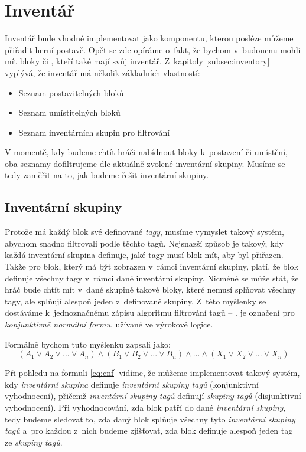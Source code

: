 
\section{Inventář}

Inventář bude vhodné implementovat jako komponentu, kterou posléze můžeme přiřadit herní postavě. Opět se zde opíráme o~fakt, že bychom v~budoucnu mohli mít bloky či \NPC{}, kteří také mají svůj inventář. Z~kapitoly \ref{subsec:inventory} vyplývá, že inventář má několik základních vlastností:

\begin{itemize}
	\item Seznam postavitelných bloků
	\item Seznam umístitelných bloků
	\item Seznam inventárních skupin pro filtrování
\end{itemize}

V momentě, kdy budeme chtít hráči nabídnout bloky k~postavení či umístění, oba seznamy dofiltrujeme dle aktuálně zvolené inventární skupiny. Musíme se tedy zaměřit na to, jak budeme řešit inventární skupiny.

\subsection{Inventární skupiny}

Protože má každý blok své definované \textit{tagy}, musíme vymyslet takový systém, abychom snadno filtrovali podle těchto tagů. Nejsnazší způsob je takový, kdy každá inventární skupina definuje, jaké tagy musí blok mít, aby byl přiřazen. Takže pro blok, který má být zobrazen v~rámci inventární skupiny, platí, že blok definuje všechny tagy v~rámci dané inventární skupiny. Nicméně se může stát, že hráč bude chtít mít v~dané skupině takové bloky, které nemusí splňovat všechny tagy, ale splňují alespoň jeden z~definované skupiny. Z~této myšlenky se dostáváme k~jednoznačnému zápisu algoritmu filtrování tagů -- \CNF{}. \CNF{} je označení pro \textit{konjunktivně normální formu}, užívané ve výrokové logice.

Formálně bychom tuto myšlenku zapsali jako:
\begin{equation}\label{eq:cnf}
	( A_1 \lor A_2 \lor ... \lor A_n )  \land ( B_1 \lor B_2 \lor ... \lor B_n ) \land ... \land ( X_1 \lor X_2 \lor ... \lor X_n )  
\end{equation}


Při pohledu na formuli \ref{eq:cnf} vidíme, že můžeme implementovat takový systém, kdy \textit{inventární skupina} definuje \textit{inventární skupiny tagů} (konjunktivní vyhodnocení), přičemž \textit{inventární skupiny tagů} definují \textit{skupiny tagů} (disjunktivní vyhodnocení). Při vyhodnocování, zda blok patří do dané \textit{inventární skupiny}, tedy budeme sledovat to, zda daný blok splňuje všechny tyto \textit{inventární skupiny tagů} a~pro každou z~nich budeme zjišťovat, zda blok definuje alespoň jeden tag ze \textit{skupiny tagů}. 

